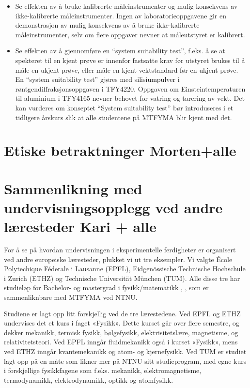 \documentclass{article}
\begin{document}
\begin{itemize}
  \item Se effekten av å bruke kalibrerte måleinstrumenter og mulig konsekvens av ikke-kalibrerte måleinstrumenter. Ingen av laboratorieoppgavene gir en demonstrasjon av mulig konsekvens av å bruke ikke-kalibrerte måleinstrumenter, selv om flere oppgaver nevner at måleutstyret er kalibrert.

  \item Se effekten av å gjennomføre en ``system suitability test'', f.eks. å se at spekteret til en kjent prøve er innenfor fastsatte krav før utstyret brukes til å måle en ukjent prøve, eller måle en kjent vektstandard før en ukjent prøve.  En ``system suitability test'' gjøres med silisiumpulver i røntgendiffraksjonsoppgaven i TFY4220. Oppgaven om Einsteintemperaturen til aluminium i TFY4165 nevner behovet for vatring og tarering av vekt. Det kan vurderes om konseptet ``System suitability test'' bør introduseres i et tidligere årskurs slik at alle studentene på MTFYMA blir kjent med det.
\end{itemize}


\section{Etiske betraktninger {\color{red} Morten+alle}}


\section{Sammenlikning med undervisningsopplegg ved andre læresteder {\color{red} Kari + alle}}

For å se på hvordan undervisningen i eksperimentelle ferdigheter er organisert ved andre europeiske læresteder, plukket vi ut tre eksempler. Vi valgte École Polytechique Féderale i Lausanne (EPFL), Eidgenössische Technische Hochschule i Zurich (ETHZ) og Technische Universität München (TUM). Alle disse tre har studieløp for Bachelor- og mastergrad i fysikk/matematikk \cite{ETHZprog}, \cite{EPFLprog}, \cite{TUMprog} som er sammenliknbare med MTFYMA ved NTNU. 

Studiene er lagt opp litt forskjellig ved de tre lærestedene. Ved EPFL og ETHZ undervises det et kurs i faget «Fysikk». Dette kurset går over flere semestre, og dekker mekanikk, termisk fysikk, bølgefysikk, elektrisitetslære, magnetisme, og relativitetsteori. Ved EPFL inngår fluidmekanikk også i kurset «Fysikk», mens ved ETHZ inngår kvantemekanikk og atom- og kjernefysikk. Ved TUM er studiet lagt opp på en måte som likner mer på NTNU sitt studieprogram, med egne kurs i forskjellige fysikkfagene som f.eks. mekanikk, elektromagnetisme, termodynamikk, elektrodynamikk, optikk og atomfysikk. 
\end{document}
